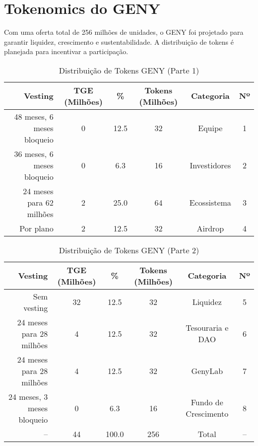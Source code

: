 \documentclass[a4paper,12pt,openany]{book}
\begin{document}
\section*{Tokenomics do GENY}
Com uma oferta total de 256 milhões de unidades, o GENY foi projetado para garantir liquidez, crescimento e sustentabilidade. A distribuição de tokens é planejada para incentivar a participação.

\begin{table}[h]
\centering
\caption{Distribuição de Tokens GENY (Parte 1)}
\small
\begin{tabular}{r c c c c c}
\hline
\textbf{Vesting} & \textbf{TGE (Milhões)} & \textbf{\%} & \textbf{Tokens (Milhões)} & \textbf{Categoria} & \textbf{Nº} \\
\hline
48 meses, 6 meses bloqueio & 0 & 12.5 & 32 & Equipe & 1 \\
36 meses, 6 meses bloqueio & 0 & 6.3 & 16 & Investidores & 2 \\
24 meses para 62 milhões & 2 & 25.0 & 64 & Ecossistema & 3 \\
Por plano & 2 & 12.5 & 32 & Airdrop & 4 \\
\hline
\end{tabular}
\end{table}

\begin{table}[h]
\centering
\caption{Distribuição de Tokens GENY (Parte 2)}
\small
\begin{tabular}{r c c c c c}
\hline
\textbf{Vesting} & \textbf{TGE (Milhões)} & \textbf{\%} & \textbf{Tokens (Milhões)} & \textbf{Categoria} & \textbf{Nº} \\
\hline
Sem vesting & 32 & 12.5 & 32 & Liquidez & 5 \\
24 meses para 28 milhões & 4 & 12.5 & 32 & Tesouraria e DAO & 6 \\
24 meses para 28 milhões & 4 & 12.5 & 32 & GenyLab & 7 \\
24 meses, 3 meses bloqueio & 0 & 6.3 & 16 & Fundo de Crescimento & 8 \\
\hline
-- & 44 & 100.0 & 256 & Total & -- \\
\hline
\end{tabular}
\end{table}
\end{document}
